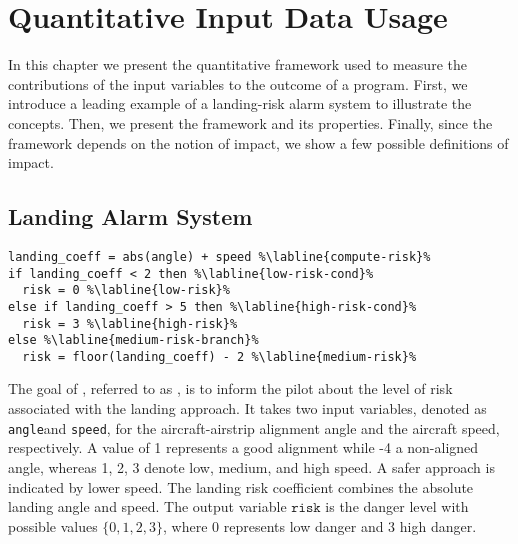 %

\chapter{Quantitative Input Data Usage}

In this chapter we present the quantitative framework used to measure the contributions of the input variables to the outcome of a program. First, we introduce a leading example of a landing-risk alarm system to illustrate the concepts. Then, we present the framework and its properties. Finally, since the framework depends on the notion of impact, we show a few possible definitions of impact.

\section{Landing Alarm System}
\newcommand*{\x}{\texttt{angle}}
\newcommand*{\y}{\texttt{speed}}
\newcommand*{\z}{\texttt{risk}}


\begin{lstlisting}[language=customPython,escapechar=\%,label={lst:landing-alarm-system},caption={Program for the landing-risk alarm system.}]
landing_coeff = abs(angle) + speed %\labline{compute-risk}%
if landing_coeff < 2 then %\labline{low-risk-cond}%
  risk = 0 %\labline{low-risk}%
else if landing_coeff > 5 then %\labline{high-risk-cond}%
  risk = 3 %\labline{high-risk}%
else %\labline{medium-risk-branch}%
  risk = floor(landing_coeff) - 2 %\labline{medium-risk}%
\end{lstlisting}


The goal of , referred to as \landingprogram, is to inform the pilot about the level of risk associated with the landing approach.
It takes two input variables, denoted as \x and \y, for the aircraft-airstrip alignment angle and the aircraft speed, respectively.
A value of 1 represents a good alignment while -4 a non-aligned angle, whereas 1, 2, 3 denote low, medium, and high speed.
A safer approach is indicated by lower speed.
The landing risk coefficient combines the absolute landing angle and speed.
The output variable $\z{}$ is the danger level with possible values $\{0, 1, 2, 3\}$, where 0 represents low danger and 3 high danger.


